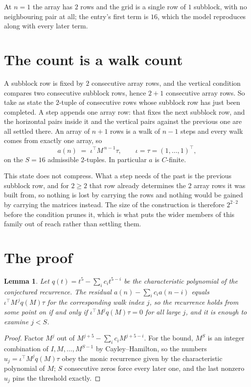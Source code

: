 \documentclass[11pt,a4paper]{article}
\theoremstyle{plain}
\newtheorem{lemma}[theorem]{Lemma}
\theoremstyle{definition}
\begin{document}
At $n=1$ the array has $2$ rows and the grid is a single row of $1$
subblock, with no neighbouring pair at all; the entry's first term is
$16$, which the model reproduces along with every later term.

\section{The count is a walk count}

A subblock row is fixed by $2$ consecutive array rows, and the vertical condition compares
two consecutive subblock rows, hence $2+1$ consecutive array rows. So take as state the
$2$-tuple of consecutive rows whose subblock row has just been completed. A step appends one
array row: that fixes the next subblock row, and the horizontal pairs inside it and the
vertical pairs against the previous one are all settled there. An array of $n+1$ rows is
a walk of $n-1$ steps and every walk comes from exactly one array, so
\[
a(n)\;=\;\iota^{\!\top}M^{\,n-1}\tau,\qquad\iota=\tau=(1,\dots,1)^{\!\top},
\]
on the $S=16$ admissible $2$-tuples. In particular $a$ is $C$-finite.

This state does not compress. What a step needs of the past is the previous subblock row, and
for $2\ge2$ that row already determines the $2$ array rows it was built from, so nothing
is lost by carrying the rows and nothing would be gained by carrying the matrices instead. The
size of the construction is therefore $2^{2\cdot2}$ before the condition prunes
it, which is what puts the wider members of this family out of reach rather than settling them.

\section{The proof}

\begin{lemma}\label{lem:crit}
Let $q(t)=t^{5}-\sum_i c_it^{5-i}$ be the characteristic polynomial of the
conjectured recurrence. The residual $a(n)-\sum_ic_ia(n-i)$ equals
$\iota^{\!\top}M^{\,j}q(M)\tau$ for the corresponding walk index $j$, so the recurrence
holds from some point on if and only if $\iota^{\!\top}M^{j}q(M)\tau=0$ for all large $j$,
and it is enough to examine $j<S$.
\end{lemma}

\begin{proof}
Factor $M^{j}$ out of $M^{j+5}-\sum_ic_iM^{j+5-i}$. For the bound, $M^{S}$
is an integer combination of $I,M,\dots,M^{S-1}$ by Cayley--Hamilton, so the numbers
$u_j=\iota^{\!\top}M^{j}q(M)\tau$ obey the monic recurrence given by the characteristic
polynomial of $M$; $S$ consecutive zeros force every later one, and the last nonzero $u_j$
pins the threshold exactly.
\end{proof}
\end{document}
